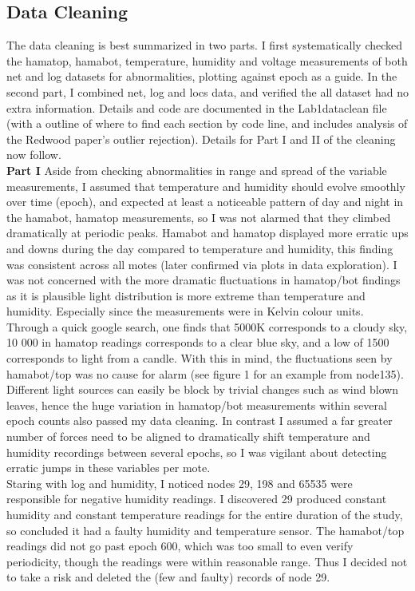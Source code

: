 \documentclass[english]{article}\usepackage[]{graphicx}\usepackage[]{color}
\begin{document}
\subsection{Data Cleaning}

The data cleaning is best summarized in two parts. I first systematically checked the hamatop, hamabot, temperature, humidity and voltage measurements of both net and log datasets for abnormalities, plotting against epoch as a guide. In the second part, I combined net, log and locs data, and verified the all dataset had no extra information. Details and code are documented in the Lab1dataclean file (with a outline of where to find each section by code line, and includes analysis of the Redwood paper's outlier rejection).  Details for Part I and II of the cleaning now follow.\\

{\bf Part I}
Aside from checking abnormalities in range and spread of the variable measurements, I assumed that temperature and humidity should evolve smoothly over time (epoch), and expected at least a noticeable pattern of day and night in the hamabot, hamatop measurements, so I was not alarmed that they climbed dramatically at periodic peaks.  Hamabot and hamatop displayed more erratic ups and downs during the day compared to temperature and humidity, this finding was consistent across all motes (later confirmed via plots in data exploration).  I was not concerned with the more dramatic fluctuations in hamatop/bot findings as it is plausible light distribution is more extreme than temperature and humidity. Especially since the measurements were in Kelvin colour units.  Through a quick google search, one finds that 5000K corresponds to a cloudy sky, 10 000 in hamatop readings corresponds to a clear blue sky, and a low of 1500 corresponds to light from a candle.  With this in mind, the fluctuations seen by hamabot/top was no cause for alarm (see figure 1 for an example from node135). Different light sources can easily be block by trivial changes such as wind blown leaves, hence the huge variation in hamatop/bot measurements within several epoch counts also passed my data cleaning.  In contrast I assumed a far greater number of forces need to be aligned to dramatically shift temperature and humidity recordings between several epochs, so I was vigilant about detecting erratic jumps in these variables per mote. \\
 
Staring with log and humidity, I noticed nodes 29, 198 and 65535 were responsible for negative humidity readings. I discovered 29 produced constant humidity and constant temperature readings for the entire duration of the study, so concluded it had a faulty humidity and temperature sensor.  The hamabot/top readings did not go past epoch 600, which was too small to even verify periodicity, though the readings were within reasonable range.  Thus I decided not to take a risk and deleted the (few and faulty) records of node 29. \\
\end{document}
